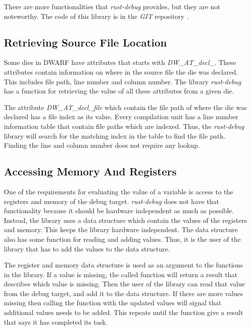 There are more functionalities that \emph{rust-debug} provides, but they are not noteworthy.
The code of this library is in the \emph{GIT} repository \cite{rust-debug}.



\subsection{Retrieving Source File Location}
Some \glspl{die} in \gls{DWARF} have attributes that starts with \emph{DW\_AT\_decl\_}.
These attributes contain information on where in the source file the \gls{die} was declared.
This includes file path, line number and column number.
The library \emph{rust-debug} has a function for retrieving the value of all these attributes from a given \gls{die}.


The attribute  \emph{DW\_AT\_decl\_file} which contain the file path of where the \gls{die} was declared has a file index as its value.
Every compilation unit has a line number information table that contain file paths which are indexed.
Thus, the \emph{rust-debug} library will search for the matching index in the table to find the file path.
Finding the line and column number does not require any lookup.


\subsection{Accessing Memory And Registers}
One of the requirements for evaluating the value of a variable is access to the registers and memory of the debug target.
\emph{rust-debug} does not have that functionality because it should be hardware independent as much as possible.
Instead, the library uses a data structure which contain the values of the registers and memory.
This keeps the library hardware independent.
The data structure also has some function for reading and adding values.
Thus, it is the user of the library that has to add the values to the data structure.


The register and memory data structure is used as an argument to the functions in the library.
If a value is missing, the called function will return a result that describes which value is missing.
Then the user of the library can read that value from the debug target, and add it to the data structure.
If there are more values missing then calling the function with the updated values will signal that additional values needs to be added.
This repeats until the function give a result that says it has completed its task.


